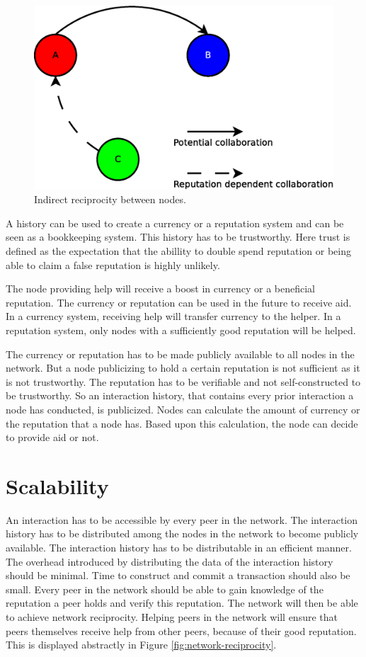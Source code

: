 \begin{figure}
	\centerline{\includegraphics[scale=0.3]{problemDescription/figs/indirect-reciprocity.eps}}
	\caption{Indirect reciprocity between nodes.}
	\label{fig:indirect-reciprocity}
\end{figure}

A history can be used to create a currency or a reputation system
and can be seen as a bookkeeping system.
This history has to be trustworthy.
Here trust is defined as the expectation that the abillity to double spend reputation
or being able to claim a false reputation is highly unlikely.

The node providing help will receive a boost in currency or a beneficial reputation.
The currency or reputation can be used in the future to receive aid.
In a currency system, receiving help will transfer currency to the helper.
In a reputation system, only nodes with a sufficiently good reputation will be helped.

The currency or reputation has to be made publicly available to all nodes in the network.
But a node publicizing to hold a certain reputation is not sufficient as it is not trustworthy.
The reputation has to be verifiable and not self-constructed to be trustworthy.
So an interaction history, that contains every prior interaction a node has conducted, is publicized.
Nodes can calculate the amount of currency or the reputation that a node has.
Based upon this calculation, the node can decide to provide aid or not.

\section{Scalability}
An interaction has to be accessible by every peer in the network.
The interaction history has to be distributed among the nodes in the network
to become publicly available.
The interaction history has to be distributable in an efficient manner.
The overhead introduced by distributing the data of the interaction history should be minimal.
Time to construct and commit a transaction should also be small.
Every peer in the network should be able to gain knowledge of the reputation a peer holds and verify this reputation.
The network will then be able to achieve network reciprocity\cite{Nowak-Cooperation}.
Helping peers in the network will ensure that peers themselves receive help from other peers,
because of their good reputation.
This is displayed abstractly in Figure \ref{fig:network-reciprocity}.

